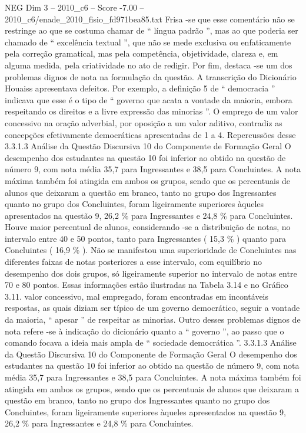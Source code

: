 \begin{textsample}{NEG Dim 3 – 2010\_c6 – Score -7.00 – 2010\_c6/enade\_2010\_fisio\_fd971bea85.txt}
Frisa -se que esse comentário não se restringe ao que se costuma chamar de “ língua padrão ”, mas ao que poderia ser chamado de “ excelência textual ”, que não se mede exclusiva ou enfaticamente pela correção gramatical, mas pela competência, objetividade, clareza e, em alguma medida, pela criatividade no ato de redigir.
Por fim, destaca -se um dos problemas dignos de nota na formulação da questão.
A transcrição do Dicionário Houaiss apresentava defeitos.
Por exemplo, a definição 5 de “ democracia ” indicava que esse é o tipo de “ governo que acata a vontade da maioria, embora respeitando os direitos e a livre expressão das minorias ”.
O emprego de um valor concessivo na oração adverbial, por oposição a um valor aditivo, contradiz as concepções efetivamente democráticas apresentadas de 1 a 4.
Repercussões desse 3.3.1.3 Análise da Questão Discursiva 10 do Componente de Formação Geral O desempenho dos estudantes na questão 10 foi inferior ao obtido na questão de número 9, com nota média 35,7 para Ingressantes e 38,5 para Concluintes.
A nota máxima também foi atingida em ambos os grupos, sendo que os percentuais de alunos que deixaram a questão em branco, tanto no grupo dos Ingressantes quanto no grupo dos Concluintes, foram ligeiramente superiores àqueles apresentados na questão 9, 26,2 \% para Ingressantes e 24,8 \% para Concluintes.
Houve maior percentual de alunos, considerando -se a distribuição de notas, no intervalo entre 40 e 50 pontos, tanto para Ingressantes ( 15,3 \% ) quanto para Concluintes ( 16,9 \% ).
Não se manifestou uma superioridade de Concluintes nas diferentes faixas de notas posteriores a esse intervalo, com equilíbrio no desempenho dos dois grupos, só ligeiramente superior no intervalo de notas entre 70 e 80 pontos.
Essas informações estão ilustradas na Tabela 3.14 e no Gráfico 3.11. valor concessivo, mal empregado, foram encontradas em incontáveis respostas, as quais diziam ser típico de um governo democrático, seguir a vontade da maioria, “ apesar ” de respeitar as minorias.
Outro desses problemas dignos de nota refere -se à indicação do dicionário quanto a “ governo ”, ao passo que o comando focava a ideia mais ampla de “ sociedade democrática ”. 3.3.1.3 Análise da Questão Discursiva 10 do Componente de Formação Geral O desempenho dos estudantes na questão 10 foi inferior ao obtido na questão de número 9, com nota média 35,7 para Ingressantes e 38,5 para Concluintes.
A nota máxima também foi atingida em ambos os grupos, sendo que os percentuais de alunos que deixaram a questão em branco, tanto no grupo dos Ingressantes quanto no grupo dos Concluintes, foram ligeiramente superiores àqueles apresentados na questão 9, 26,2 \% para Ingressantes e 24,8 \% para Concluintes.

\end{textsample}
